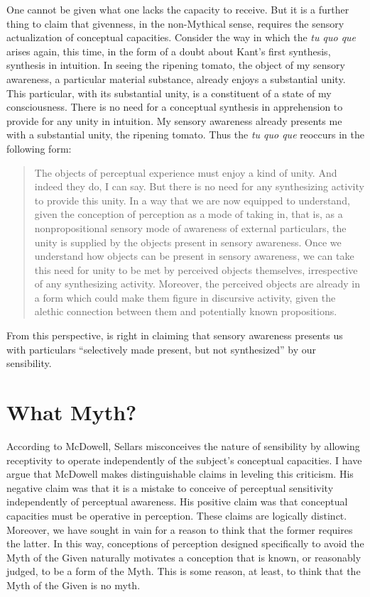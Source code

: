 \documentclass[12pt]{article}
\begin{document}
One cannot be given what one lacks the capacity to receive. But it is a further thing to claim that givenness, in the non-Mythical sense, requires the sensory actualization of conceptual capacities. Consider the way in which the \emph{tu quo que} arises again, this time, in the form of a doubt about Kant's first synthesis, synthesis in intuition. In seeing the ripening tomato, the object of my sensory awareness, a particular material substance, already enjoys a substantial unity. This particular, with its substantial unity, is a constituent of a state of my consciousness. There is no need for a conceptual synthesis in apprehension to provide for any unity in intuition. My sensory awareness already presents me with a substantial unity, the ripening tomato. Thus the \emph{tu quo que} reoccurs in the following form:
\begin{quote}
	The objects of perceptual experience must enjoy a kind of unity. And indeed they do, I can say. But there is no need for any synthesizing activity to provide this unity. In a way that we are now equipped to understand, given the conception of perception as a mode of taking in, that is, as a nonpropositional sensory mode of awareness of external particulars, the unity is supplied by the objects present in sensory awareness. Once we understand how objects can be present in sensory awareness, we can take this need for unity to be met by perceived objects themselves, irrespective of any synthesizing activity. Moreover, the perceived objects are already in a form which could make them figure in discursive activity, given the alethic connection between them and potentially known propositions.
\end{quote}
From this perspective, \citet[285]{Johnston:2006uq} is right in claiming that sensory awareness presents us with particulars ``selectively made present, but not synthesized'' by our sensibility. 


\section{What Myth?} %
\label{sec:what_myth_}

According to McDowell, Sellars misconceives the nature of sensibility by allowing receptivity to operate independently of the subject's conceptual capacities. I have argue that McDowell makes distinguishable claims in leveling this criticism. His negative claim was that it is a mistake to conceive of perceptual sensitivity independently of perceptual awareness. His positive claim was that conceptual capacities must be operative in perception. These claims are logically distinct. Moreover, we have sought in vain for a reason to think that the former requires the latter. In this way, conceptions of perception designed specifically to avoid the Myth of the Given naturally motivates a conception that is known, or reasonably judged, to be a form of the Myth. This is some reason, at least, to think that the Myth of the Given is no myth.
\end{document}
